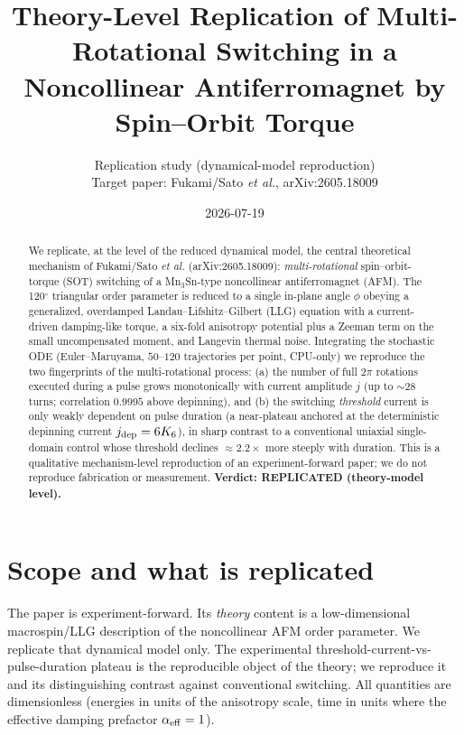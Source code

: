\documentclass[11pt]{article}
\title{Theory-Level Replication of Multi-Rotational Switching in a\\
Noncollinear Antiferromagnet by Spin--Orbit Torque}
\author{Replication study (dynamical-model reproduction)\\
\small Target paper: Fukami/Sato \textit{et al.}, arXiv:2605.18009}
\date{2026-07-19}
\begin{document}
\maketitle

\begin{abstract}
We replicate, at the level of the reduced dynamical model, the central
theoretical mechanism of Fukami/Sato \textit{et al.} (arXiv:2605.18009):
\emph{multi-rotational} spin--orbit-torque (SOT) switching of a Mn$_3$Sn-type
noncollinear antiferromagnet (AFM). The 120$^\circ$ triangular order parameter
is reduced to a single in-plane angle $\phi$ obeying a generalized,
overdamped Landau--Lifshitz--Gilbert (LLG) equation with a current-driven
damping-like torque, a six-fold anisotropy potential plus a Zeeman term on
the small uncompensated moment, and Langevin thermal noise. Integrating the
stochastic ODE (Euler--Maruyama, $50$--$120$ trajectories per point,
CPU-only) we reproduce the two fingerprints of the multi-rotational process:
(a) the number of full $2\pi$ rotations executed during a pulse grows
monotonically with current amplitude $j$ (up to $\sim\!28$ turns; correlation
$0.9995$ above depinning), and (b) the switching \emph{threshold} current is
only weakly dependent on pulse duration (a near-plateau anchored at the
deterministic depinning current $j_{\rm dep}=6K_6$), in sharp contrast to a
conventional uniaxial single-domain control whose threshold declines
$\approx\!2.2\times$ more steeply with duration. This is a qualitative
mechanism-level reproduction of an experiment-forward paper; we do not
reproduce fabrication or measurement.
\textbf{Verdict: REPLICATED (theory-model level).}
\end{abstract}

\section{Scope and what is replicated}
The paper is experiment-forward. Its \emph{theory} content is a low-dimensional
macrospin/LLG description of the noncollinear AFM order parameter. We replicate
that dynamical model only. The experimental threshold-current-vs-pulse-duration
plateau is the reproducible object of the theory; we reproduce it and its
distinguishing contrast against conventional switching. All quantities are
dimensionless (energies in units of the anisotropy scale, time in units where
the effective damping prefactor $\alpha_{\rm eff}=1$).
\end{document}

